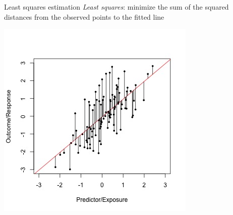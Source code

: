 \documentclass[10pt,t]{beamer}
\begin{document}
\begin{frame}{Least squares estimation}
\textit{Least squares}: minimize the sum of the squared distances from the observed points to the fitted line

\vspace{0.3cm}

\centering \includegraphics[scale=0.45]{linear-regr-ls.jpg}

\end{frame}
\end{document}
